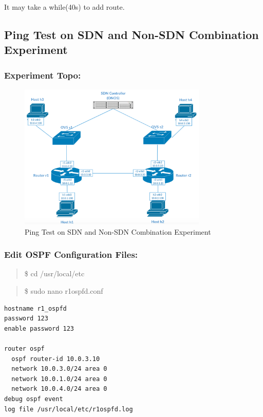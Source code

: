 It may take a while(40s) to add route.

\subsection{Ping Test on SDN and Non-SDN Combination Experiment}\label{run-sdn-and-non-sdn-combination-experiment}

\subsubsection{Experiment Topo:}\label{experiment-topo-2}

\begin{figure}[h]
\centering
\includegraphics[width=0.8\textwidth]{./Figure/Topo/Exp3.png}
\caption{Ping Test on SDN and Non-SDN Combination Experiment \label{fig:Exp3}}
\end{figure}

\subsubsection{Edit OSPF Configuration
Files:}\label{edit-ospf-configuration-files}

\begin{quote}
\$ cd /usr/local/etc
\end{quote}

\begin{quote}
\$ sudo nano r1ospfd.conf
\end{quote}

\begin{adjustwidth}{1cm}{0cm}
\begin{verbatim}
hostname r1_ospfd
password 123
enable password 123

router ospf
  ospf router-id 10.0.3.10
  network 10.0.3.0/24 area 0
  network 10.0.1.0/24 area 0
  network 10.0.4.0/24 area 0
debug ospf event
log file /usr/local/etc/r1ospfd.log
\end{verbatim}
\end{adjustwidth}

